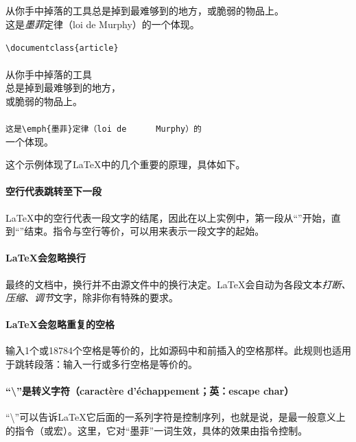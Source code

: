 \begin{codelist}[1.1]{
    从你手中掉落的工具总是掉到最难够到的地方，或脆弱的物品上。\\
    这是\emph{墨菲}定律（loi de Murphy）的一个体现。
}  \begin{dmd}
    \verb+\documentclass{article}+\\
    \verb++\\
    从你手中掉落的工具\\
    总是掉到最难够到的地方，\\
    或脆弱的物品上。\\
    ~\\
    \verb+这是\emph{墨菲}定律（loi de      Murphy）的+\\
    一个体现。\\
    \verb++
\end{dmd}
\end{codelist}

这个示例体现了\LaTeX 中的几个重要的原理，具体如下。

\paragraph*{空行代表跳转至下一段} \LaTeX 中的空行代表一段文字的结尾，因此在以上实例中，第一段从“”开始，直到“”结束。指令与空行等价，可以用来表示一段文字的起始。

\paragraph*{\LaTeX 会忽略换行}最终的文档中，换行并不由源文件中的换行决定。\LaTeX 会自动为各段文本\textit{打断、压缩、调节}文字，除非你有特殊的要求。

\paragraph*{\LaTeX 会忽略重复的空格}输入1个或18784个空格是等价的，比如源码中和前插入的空格那样。此规则也适用于跳转段落：输入一行或多行空格是等价的。

\paragraph*{“\backslash ”是转义字符（caractère d’échappement；英：escape char）}“\backslash ”可以告诉\LaTeX 它后面的一系列字符是控制序列，也就是说，是最一般意义上的指令（或宏）。这里，它对“墨菲”一词生效，具体的效果由指令控制。

